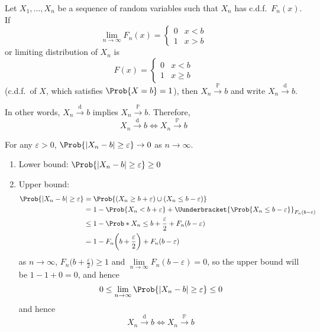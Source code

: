 \begin{Theorem}{}{}
    Let $ X_1,\ldots,X_n $ be a sequence of random variables
    such that $ X_n $ has c.d.f.\ $ F_n(x) $. If
    \[ \lim\limits_{{n} \to {\infty}} F_n(x)=\begin{cases}
            0 & x<b \\
            1 & x>b
        \end{cases} \]
    or limiting distribution of $ X_n $ is
    \[ F(x)=\begin{cases}
            0 & x<b    \\
            1 & x\ge b
        \end{cases} \]
    (c.d.f.\ of $ X $, which satisfies $ \Prob{X=b}=1 $), then
    $ X_n\stackrel{\mathbb{P}}{\to}b $ and write
    $ X_n\stackrel{\text{d}}{\to}b $.

    In other words, $ X_n\stackrel{\text{d}}{\to}b $ implies
    $ X_n\stackrel{\mathbb{P}}{\to}b $. Therefore,
    \[ X_n\stackrel{\text{d}}{\to}b\iff X_n\stackrel{\mathbb{P}}{\to}b \]
\end{Theorem}
\begin{Proof}{}{}
    For any $ \varepsilon>0 $, $ \Prob{\abs{X_n-b}\ge \varepsilon}\to 0 $
    as $ n\to\infty $.
    \begin{enumerate}[label=(\roman*)]
        \item Lower bound: $ \Prob{\abs{X_n-b}\ge \varepsilon}\ge 0 $
        \item Upper bound:
              \begin{align*}
                  \Prob{\abs{X_n-b}\ge \varepsilon}
                   & =\Prob{(X_n\ge b+\varepsilon)\cup (X_n\le b-\varepsilon)}       \\
                   & =1-\Prob{X_n<b+\varepsilon}+
                  \Uunderbracket{\Prob{X_n\le b-\varepsilon}}_{F_n(b-\varepsilon)}   \\
                   & \le 1-\Prob*{X_n\le b+\frac{\varepsilon}{2}}+F_n(b-\varepsilon) \\
                   & =1-F_n\biggl(b+\frac{\varepsilon}{2}\biggr)+F_n(b-\varepsilon)
              \end{align*}
              as $ n\to\infty $, $ \displaystyle F_n\biggl(b+\frac{\varepsilon}{2}\biggr)\ge 1 $
              and $ \lim\limits_{{n} \to {\infty}} F_n(b-\varepsilon)=0 $,
              so the upper bound will be $ 1-1+0=0 $, and hence
              \[ 0\le \lim\limits_{{n} \to {\infty}} \Prob{\abs{X_n-b}\ge \varepsilon}
                  \le 0 \]
              and hence
              \[ X_n\stackrel{\text{d}}{\to}b\iff X_n\stackrel{\mathbb{P}}{\to}b \]
    \end{enumerate}
\end{Proof}
